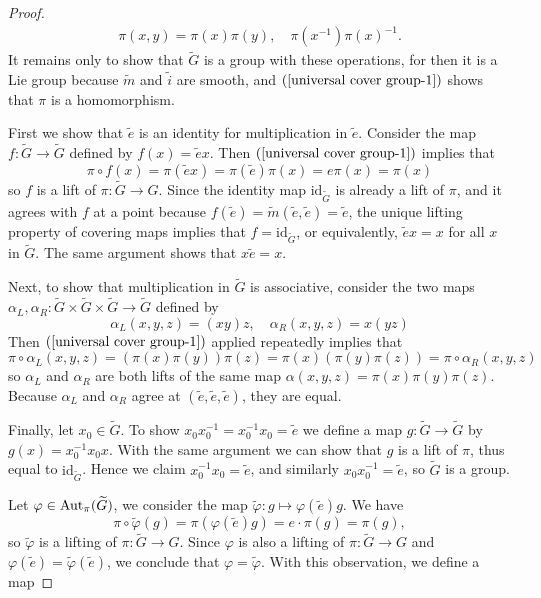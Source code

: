 \begin{proof}
\begin{align}\label{universal cover group-1}
\pi(x,y)=\pi(x)\pi(y),\quad\pi(x^{-1})\pi(x)^{-1}.
\end{align}
It remains only to show that $\widetilde{G}$ is a group with these operations, for then it is a Lie group because $\widetilde{m}$ and $\widetilde{i}$ are smooth, and $(\ref{universal cover group-1})$ shows that $\pi$ is a homomorphism.\par
First we show that $\widetilde{e}$ is an identity for multiplication in $\widetilde{e}$. Consider the map $f:\widetilde{G}\to\widetilde{G}$ defined by $f(x)=\widetilde{e}x$. Then $(\ref{universal cover group-1})$ implies that 
\[\pi\circ f(x)=\pi(\widetilde{e}x)=\pi(\widetilde{e})\pi(x)=e\pi(x)=\pi(x)\]
so $f$ is a lift of $\pi:\widetilde{G}\to G$. Since the identity map $\mathrm{id}_{\widetilde{G}}$ is already a lift of $\pi$, and it agrees with $f$ at a point because $f(\widetilde{e})=\widetilde{m}(\widetilde{e},\widetilde{e})=\widetilde{e}$, the unique lifting property of covering maps implies that $f=\mathrm{id}_{\widetilde{G}}$, or equivalently, $\widetilde{e}x=x$ for all $x$ in $\widetilde{G}$. The same argument shows that $x\widetilde{e}=x$.\par
Next, to show that multiplication in $\widetilde{G}$ is associative, consider the two maps $\alpha_L,\alpha_R:\widetilde{G}\times\widetilde{G}\times\widetilde{G}\to\widetilde{G}$ defined by
\[\alpha_L(x,y,z)=(xy)z,\quad\alpha_R(x,y,z)=x(yz)\]
Then $(\ref{universal cover group-1})$ applied repeatedly implies that
\[\pi\circ\alpha_L(x,y,z)=(\pi(x)\pi(y))\pi(z)=\pi(x)(\pi(y)\pi(z))=\pi\circ\alpha_R(x,y,z)\]
so $\alpha_L$ and $\alpha_R$ are both lifts of the same map $\alpha(x,y,z)=\pi(x)\pi(y)\pi(z)$. Because $\alpha_L$ and $\alpha_R$ agree at $(\widetilde{e},\widetilde{e},\widetilde{e})$, they are equal.\par
Finally, let $x_0\in\widetilde{G}$. To show $x_0x_0^{-1}=x_0^{-1}x_0=\widetilde{e}$ we define a map $g:\widetilde{G}\to\widetilde{G}$ by $g(x)=x_0^{-1}x_0x$. With the same argument we can show that $g$ is a lift of $\pi$, thus equal to $\mathrm{id}_{\widetilde{G}}$. Hence we claim $x_0^{-1}x_0=\widetilde{e}$, and similarly $x_0x_0^{-1}=\widetilde{e}$, so $\widetilde{G}$ is a group.\par
Let $\varphi\in\mathrm{Aut}_{\pi}(\widetilde{G})$, we consider the map $\widetilde{\varphi}:g\mapsto\varphi(\widetilde{e})g$. We have
\[\pi\circ\widetilde{\varphi}(g)=\pi(\varphi(\widetilde{e})g)=e\cdot\pi(g)=\pi(g),\]
so $\widetilde{\varphi}$ is a lifting of $\pi:\widetilde{G}\to G$. Since $\varphi$ is also a lifting of $\pi:\widetilde{G}\to G$ and $\varphi(\widetilde{e})=\widetilde{\varphi}(\widetilde{e})$, we conclude that $\varphi=\widetilde{\varphi}$. With this observation, we define a map

\end{proof}

